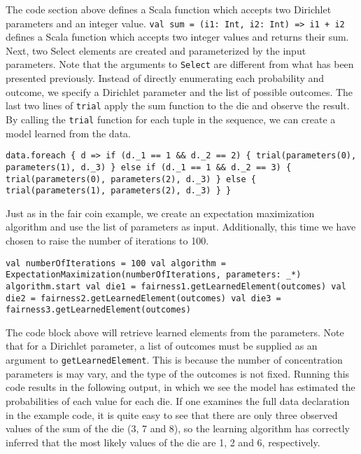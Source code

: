 The code section above defines a Scala function which accepts two Dirichlet parameters and an integer value. \texttt{val sum = (i1: Int, i2: Int) => i1 + i2} defines a Scala function which accepts two integer values and returns their sum.  Next, two Select elements are created and parameterized by the input parameters. Note that the arguments to \texttt{Select} are different from what has been presented previously. Instead of directly enumerating each probability and outcome, we specify a Dirichlet parameter and the list of possible outcomes. The last two lines of \texttt{trial} apply the sum function to the die and observe the result. By calling the \texttt{trial} function for each tuple in the sequence, we can create a model learned from the data.

\begin{flushleft}
\texttt{data.foreach \{ d =>
\newline if (d.\_1 == 1 \&\& d.\_2 == 2) \{
\newline \tab trial(parameters(0), parameters(1), d.\_3)
\newline \tab \} else if (d.\_1 == 1 \&\& d.\_2 == 3) \{
\newline \tab trial(parameters(0), parameters(2), d.\_3)
\newline \} else \{
\newline \tab trial(parameters(1), parameters(2), d.\_3)
\newline \}
\newline \}
}
\end{flushleft}

Just as in the fair coin example, we create an expectation maximization algorithm and use the list of parameters as input. Additionally, this time we have chosen to raise the number of iterations to 100.

\begin{flushleft}
\texttt{val numberOfIterations = 100
\newline val algorithm = ExpectationMaximization(numberOfIterations, parameters: \_*)
\newline algorithm.start
\newline 
\newline val die1 = fairness1.getLearnedElement(outcomes) 
\newline val die2 = fairness2.getLearnedElement(outcomes) 
\newline val die3 = fairness3.getLearnedElement(outcomes)
}
\end{flushleft}

The code block above will retrieve learned elements from the parameters. Note that for a Dirichlet parameter, a list of outcomes must be supplied as an argument to \texttt{getLearnedElement}. This is because the number of concentration parameters is may vary, and the type of the outcomes is not fixed. Running this code results in the following output, in which we see the model has estimated the probabilities of each value for each die. If one examines the full data declaration in the example code, it is quite easy to see that there are only three observed values of the sum of the die (3, 7 and 8), so the
learning algorithm has correctly inferred that the most likely values of the die are 1, 2 and 6, respectively.

